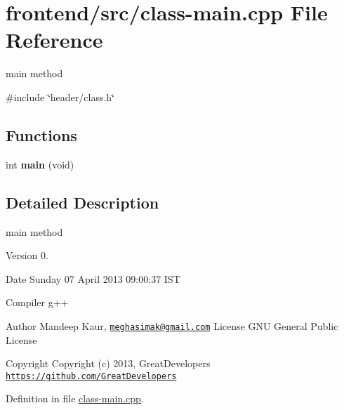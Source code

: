 \hypertarget{class-main_8cpp}{\section{frontend/src/class-\/main.cpp \-File \-Reference}
\label{class-main_8cpp}
}


main method  


{\ttfamily \#include \char`\"{}header/class.\-h\char`\"{}}\*
\subsection*{\-Functions}
\begin{DoxyCompactItemize}
\item 
\hypertarget{class-main_8cpp_a840291bc02cba5474a4cb46a9b9566fe}{int {\bfseries main} (void)}\label{class-main_8cpp_a840291bc02cba5474a4cb46a9b9566fe}

\end{DoxyCompactItemize}


\subsection{\-Detailed \-Description}
main method \begin{DoxyVersion}{\-Version}
0. 
\end{DoxyVersion}
\begin{DoxyDate}{\-Date}
\-Sunday 07 \-April 2013 09\-:00\-:37 \-I\-S\-T\par
 \-Compiler g++
\end{DoxyDate}
\begin{DoxyAuthor}{\-Author}
\-Mandeep \-Kaur, \href{mailto:meghasimak@gmail.com}{\tt meghasimak@gmail.\-com} \-License \-G\-N\-U \-General \-Public \-License 
\end{DoxyAuthor}
\begin{DoxyCopyright}{\-Copyright}
\-Copyright (c) 2013, \-Great\-Developers \href{https://github.com/GreatDevelopers}{\tt https\-://github.\-com/\-Great\-Developers} 
\end{DoxyCopyright}


\-Definition in file \hyperlink{class-main_8cpp_source}{class-\/main.\-cpp}.

